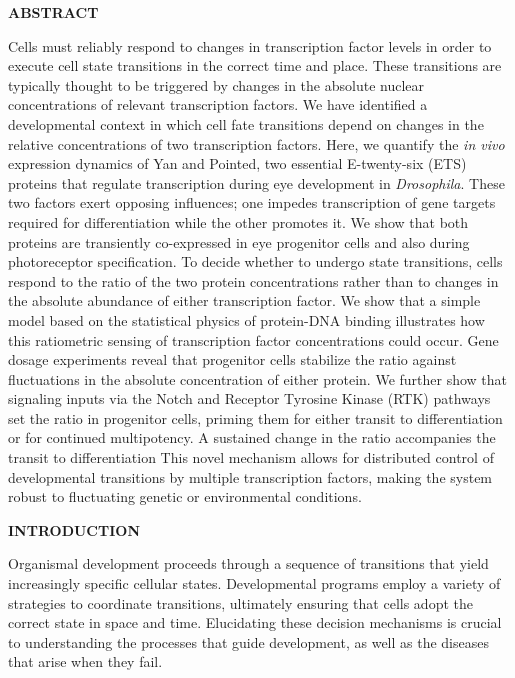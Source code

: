 \textbf{ABSTRACT}

Cells must reliably respond to changes in transcription factor levels in order to execute cell state transitions in the correct time and place. These transitions are typically thought to be triggered by changes in the absolute nuclear concentrations of relevant transcription factors. We have identified a developmental context in which cell fate transitions depend on changes in the relative concentrations of two transcription factors. Here, we quantify the \emph{in vivo} expression dynamics of Yan and Pointed, two essential E-twenty-six (ETS) proteins that regulate transcription during eye development in \emph{Drosophila}. These two factors exert opposing influences; one impedes transcription of gene targets required for differentiation while the other promotes it. We show that both proteins are transiently co-expressed in eye progenitor cells and also during photoreceptor specification. To decide whether to undergo state transitions, cells respond to the ratio of the two protein concentrations rather than to changes in the absolute abundance of either transcription factor. We show that a simple model based on the statistical physics of protein-DNA binding illustrates how this ratiometric sensing of transcription factor concentrations could occur. Gene dosage experiments reveal that progenitor cells stabilize the ratio against fluctuations in the absolute concentration of either protein. We further show that signaling inputs via the Notch and Receptor Tyrosine Kinase (RTK) pathways set the ratio in progenitor cells, priming them for either transit to differentiation or for continued multipotency. A sustained change in the ratio accompanies the transit to differentiation This novel mechanism allows for distributed control of developmental transitions by multiple transcription factors, making the system robust to fluctuating genetic or environmental conditions.

\textbf{INTRODUCTION}

Organismal development proceeds through a sequence of transitions that yield increasingly specific cellular states. Developmental programs employ a variety of strategies to coordinate transitions, ultimately ensuring that cells adopt the correct state in space and time. Elucidating these decision mechanisms is crucial to understanding the processes that guide development, as well as the diseases that arise when they fail.

